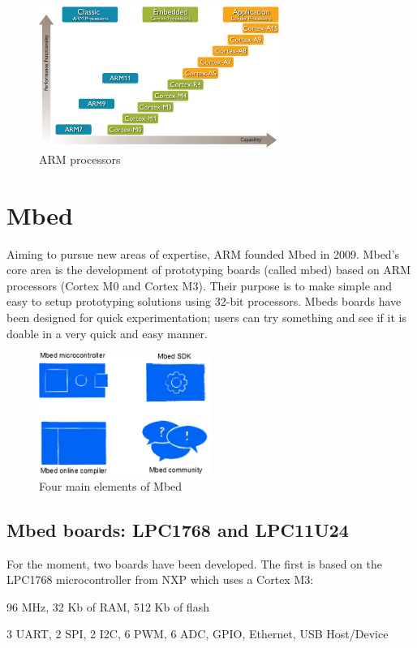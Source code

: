 \documentclass[pdftex,10pt,a4paper]{report}
\newenvironment{packed_item}{
\begin{itemize}
  \setlength{\itemsep}{1pt}
  \setlength{\parskip}{0pt}
  \setlength{\parsep}{0pt}
}{\end{itemize}}
\begin{document}
\begin{figure}[h!]
\centering
\includegraphics[width=0.7\textwidth]{./arm_proc.jpg}
\caption{ARM processors}
\label{ARM processors}
\end{figure}

\newpage

\section{Mbed}
Aiming to pursue new areas of expertise, ARM founded Mbed in 2009. Mbed's core area is the development of prototyping boards (called mbed) based on ARM processors (Cortex M0 and Cortex M3). Their purpose is to make simple and easy to setup prototyping solutions using 32-bit processors. Mbeds boards have been designed for quick experimentation; users can try something and see if it is doable in a very quick and easy manner.

\begin{figure}[h!]
\centering
\includegraphics[width=0.5\textwidth]{./mbed_4elements.png}
\caption{Four main elements of Mbed}
\label{Four main elements of Mbed}
\end{figure}

\subsection{Mbed boards: LPC1768 and LPC11U24}
For the moment, two boards have been developed. The first is based on the LPC1768 microcontroller from NXP which uses a Cortex M3:
\begin{packed_item}
	\item 96 MHz, 32 Kb of RAM, 512 Kb of flash
	\item 3 UART, 2 SPI, 2 I2C, 6 PWM, 6 ADC, GPIO, Ethernet, USB Host/Device
\end{packed_item}
\end{document}

